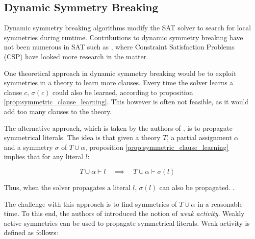 \subsection{Dynamic Symmetry Breaking}
	Dynamic symmetry breaking algorithms modify the SAT solver to search for local
	symmetries during runtime. Contributions to dynamic symmetry breaking have not been
	numerous in SAT such as \cite{sabharwal2005symchaff}, where Constraint Satisfaction
	Problems (CSP) have looked more research in the matter.

	One theoretical approach in dynamic symmetry breaking would be to exploit symmetries in
	a theory to learn more clauses.
	Every time the solver learns a clause $c$, $\sigma(c)$ could also be learned, according
	to proposition \ref{prop:symmetric_clause_learning}.
	This however is often not feasible, as it would add too many clauses to the theory.

	The alternative approach, which is taken by the authors of
	\cite{devriendt2012symmetry}, is to propagate symmetrical literals.
	The idea is that given a theory $T$, a partial assignment $\alpha$ and a symmetry
	$\sigma$ of $T \cup \alpha$, proposition \ref{prop:symmetric_clause_learning} implies
	that for any literal $l$:

	\begin{equation}
		T \cup \alpha \vdash l \quad
		\implies
		\quad T \cup \alpha \vdash \sigma(l)
	\end{equation}

	Thus, when the solver propagates a literal $l$, $\sigma(l)$ can also be propagated.
	.

	The challenge with this approach is to find symmetries of $T \cup \alpha$ in a
	reasonable time.
	To this end, the authors of \cite{devriendt2012symmetry} introduced the notion of
	\emph{weak activity}.
	Weakly active symmetries can be used to propagate symmetrical literals.
	Weak activity is defined as follows:\\

	\begin{definition}
		\todoi{\ldots}
	\end{definition}


